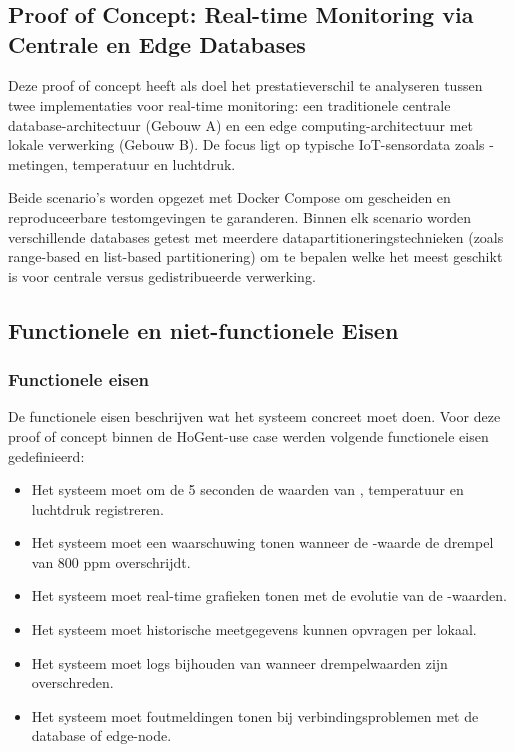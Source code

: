 \chapter{}%
\label{ch:proof-of-concept}

\section{Proof of Concept: Real-time Monitoring via Centrale en Edge Databases}

Deze proof of concept heeft als doel het prestatieverschil te analyseren tussen twee implementaties voor real-time monitoring: een traditionele centrale database-architectuur (Gebouw A) en een edge computing-architectuur met lokale verwerking (Gebouw B). De focus ligt op typische IoT-sensordata zoals -metingen, temperatuur en luchtdruk.

Beide scenario's worden opgezet met Docker Compose om gescheiden en reproduceerbare testomgevingen te garanderen. Binnen elk scenario worden verschillende databases getest met meerdere datapartitioneringstechnieken (zoals range-based en list-based partitionering) om te bepalen welke het meest geschikt is voor centrale versus gedistribueerde verwerking.
\section{Functionele en niet-functionele Eisen}

\subsection{Functionele eisen}

De functionele eisen beschrijven wat het systeem concreet moet doen. Voor deze proof of concept binnen de HoGent-use case werden volgende functionele eisen gedefinieerd:

\begin{itemize}
    \item Het systeem moet om de 5 seconden de waarden van , temperatuur en luchtdruk registreren.
    \item Het systeem moet een waarschuwing tonen wanneer de -waarde de drempel van 800 ppm overschrijdt.
    \item Het systeem moet real-time grafieken tonen met de evolutie van de -waarden.
    \item Het systeem moet historische meetgegevens kunnen opvragen per lokaal.
    \item Het systeem moet logs bijhouden van wanneer drempelwaarden zijn overschreden.
    \item Het systeem moet foutmeldingen tonen bij verbindingsproblemen met de database of edge-node.
\end{itemize}

